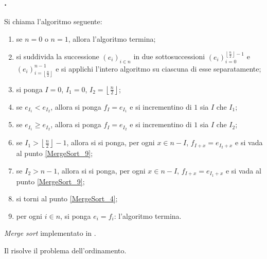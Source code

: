 \subsubsection{.}
\label{AlgoritmiEStruttureDiDati_MergeSort}
\begin{Definition}
	Si chiama
  l'algoritmo seguente:
  \begin{enumerate}
    \item\label{MergeSort_1} se $n = 0$ o $n = 1$, allora l'algoritmo termina;
    \item\label{MergeSort_2} si suddivida la successione
      $(e_i)_{i \in n}$
      in due sottosuccessioni
      $(e_i)_{i = 0}^{\left \lfloor \frac{n}{2} \right \rfloor - 1}$
      e 
      $(e_i)_{i = \left \lfloor \frac{n}{2} \right \rfloor}^{n - 1}$
      e si applichi l'intero algoritmo su ciascuna di esse separatamente;
    \item\label{MergeSort_3} si ponga
      $I = 0$,
      $I_1 = 0$,
      $I_2 = \left \lfloor \frac{n}{2} \right \rfloor$;
    \item\label{MergeSort_4} se $e_{I_1} < e_{I_2}$,
      allora si ponga
      $f_I = e_{I_1}$
      e si incrementino di $1$ sia $I$ che $I_1$;
    \item\label{MergeSort_5} se $e_{I_1} \geq e_{I_2}$,
      allora si ponga
      $f_I = e_{I_2}$
      e si incrementino di $1$ sia $I$ che $I_2$;
    \item\label{MergeSort_6} se
      $I_1 > \left \lfloor \frac{n}{2} \right \rfloor - 1$, allora si
      si ponga, per ogni $x \in n - I$,
      $f_{I + x} = e_{I_2 + x}$
      e si vada al punto \ref{MergeSort_9};
    \item\label{MergeSort_7} se $I_2 > n - 1$, allora si
      si ponga, per ogni $x \in n - I$,
      $f_{I + x} = e_{I_1 + x}$
      e si vada al punto \ref{MergeSort_9};
    \item\label{MergeSort_8} si torni al punto \ref{MergeSort_4};
    \item\label{MergeSort_9} per ogni $i \in n$, si ponga $e_i = f_i$:
      l'algoritmo termina.
  \end{enumerate}
\end{Definition}
\begin{listing}
	\caption{\textit{Merge sort} implementato in .}
\end{listing}
\begin{Theorem}
	Il  risolve il problema dell'ordinamento.
\end{Theorem}
